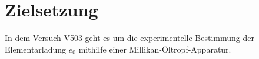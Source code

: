 \section{Zielsetzung} 

\begin{flushleft}
    In dem Versuch V503 geht es um die experimentelle Bestimmung der Elementarladung $e_{0}$ mithilfe einer Millikan-Öltropf-Apparatur.
\end{flushleft}


